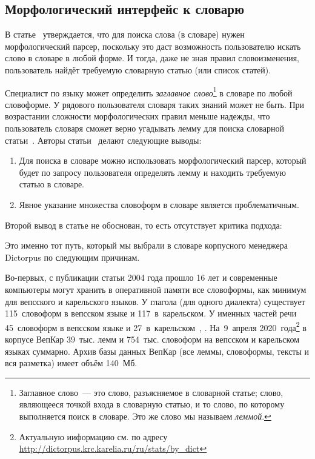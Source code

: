 
\subsection{Морфологический интерфейс к словарю} \label{sect_morpho_API_to_dict}

В статье~\cite[с.~65]{morphoAPI2dict2004Maxwell} утверждается, 
что для поиска слова (в словаре) нужен морфологический парсер, 
поскольку это даст возможность пользователю искать слово в словаре в любой форме. 
И тогда, даже не зная правил словоизменения, пользователь найдёт требуемую словарную статью (или список статей).

Специалист по языку может определить \emph{заглавное слово}\footnote{Заглавное слово~--- это слово, разъясняемое в словарной статье; слово, являющееся точкой входа в словарную статью, и то слово, по которому выполняется поиск в словаре. Это же слово мы называем \emph{леммой}.} в словаре по любой словоформе. У рядового пользователя словаря таких знаний может не быть.
При возрастании сложности морфологических правил меньше надежды, 
что пользователь словаря сможет верно угадывать лемму 
для поиска словарной статьи~\cite[с.~66]{morphoAPI2dict2004Maxwell}. 
Авторы статьи~\cite{morphoAPI2dict2004Maxwell} делают следующие выводы:
\begin{enumerate}
\item Для поиска в словаре можно использовать морфологический парсер, который будет по запросу пользователя определять лемму и находить требуемую статью в словаре.
\item Явное указание множества словоформ в словаре является проблематичным.
\end{enumerate}

\noindent
Второй вывод в статье не обоснован,
то есть отсутствует критика подхода: 


\noindent
Это именно тот путь, который мы выбрали в словаре корпусного менеджера Dictorpus 
по следующим причинам. 

Во-первых, с публикации статьи 2004 года прошло 16 лет и современные компьютеры могут хранить в оперативной памяти все словоформы, как минимум для вепсского и карельского языков. 
У глагола (для одного диалекта) существует 115~словоформ в вепсском языке и 117~в~карельском. 
У именных частей речи 45~словоформ в вепсском языке и 
27~в~карельском~\cite[с.~415--428]{ZaitsevaNG2012OrphDict}, 
\cite{NovakPenttonenRuuskanenSiilin2019, 
        Zaikov2000KarGram, 
        ZaitsevaMI1981, 
        ZaitsevaNG1981VepsName, 
        ZaitsevaNG2002VepsVerb}. 
На~9~апреля 2020~года\footnote{Актуальную ииформацию см. по адресу \url{http://dictorpus.krc.karelia.ru/ru/stats/by_dict}} в корпусе ВепКар 39~тыс. лемм и 754~тыс. словоформ на вепсском и карельском языках суммарно. 
Архив базы данных ВепКар (все леммы, словоформы, тексты и вся разметка) имеет объём 140~Мб.

